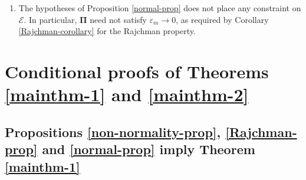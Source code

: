\documentclass[12pt, twoside]{article}
\theoremstyle{definition}
\numberwithin{equation}{section}
\begin{document}
\begin{enumerate}[1.]
\item The hypotheses of Proposition \ref{normal-prop} does not place any constraint on $\mathcal E$. In particular, $\pmb{\Pi}$ need not satisfy $\varepsilon_m \rightarrow 0$, as required by Corollary \ref{Rajchman-corollary} for the Rajchman property. 
\end{enumerate} 




\section{Conditional proofs of Theorems \ref{mainthm-1} and \ref{mainthm-2}} \label{mainproof-section}
\subsection{Propositions \ref{non-normality-prop}, \ref{Rajchman-prop} and \ref{normal-prop} imply Theorem \ref{mainthm-1}} \label{mainthm-1-proof-section} 
\end{document}
